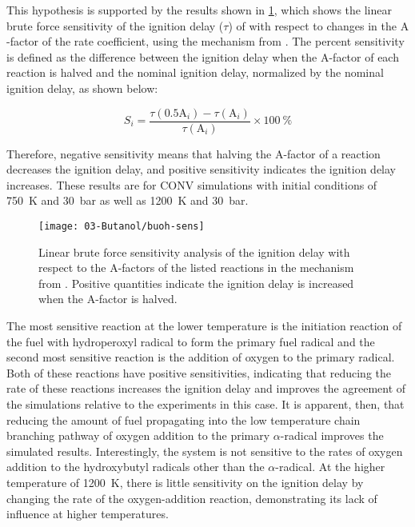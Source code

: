 \documentclass[../main.tex]{subfiles}
\begin{document}
This hypothesis is supported by the results shown in \cref{fig:buoh-sens},
which shows the linear brute force sensitivity of the ignition delay ($\tau$)
of \iBuOH{} with respect to changes in the $\mathrm{A}$-factor of the rate coefficient, using
the mechanism from \textcite{Sarathy2012}. The percent sensitivity is defined
as the difference between the ignition delay when the $\mathrm{A}$-factor of each reaction
is halved and the nominal ignition delay, normalized by the nominal ignition
delay, as shown below:

\begin{equation}
    \label{eq:buoh-sens}
    S_i=\frac{\tau(0.5\mathrm{A}_i )-\tau(\mathrm{A}_i )}{\tau(\mathrm{A}_i)} \times \SI{100}{\percent}
\end{equation}

Therefore, negative sensitivity means that halving the $\mathrm{A}$-factor of a reaction
decreases the ignition delay, and positive sensitivity indicates the ignition
delay increases. These results are for CONV simulations with initial conditions
of \SI{750}{\kelvin} and \SI{30}{\bar} as well as \SI{1200}{\kelvin} and \SI{30}{\bar}.

\begin{figure}
    \texttt{[image: 03-Butanol/buoh-sens]}
    \caption{Linear brute force sensitivity analysis of the ignition delay with
        respect to the A-factors of the listed reactions in the mechanism from
        \textcite{Sarathy2012}. Positive quantities indicate the ignition delay
        is increased when the $\mathrm{A}$-factor is halved.}
    \label{fig:buoh-sens}
\end{figure}

The most sensitive reaction at the lower temperature is the initiation reaction
of the fuel with hydroperoxyl radical to form the primary fuel radical and the
second most sensitive reaction is the addition of oxygen to the primary
radical. Both of these reactions have positive sensitivities, indicating that
reducing the rate of these reactions increases the ignition delay
and improves the agreement of the simulations relative to the experiments
in this case. It is apparent, then, that reducing the amount of fuel
propagating into the low temperature chain branching pathway of oxygen
addition to the primary $\alpha$-radical improves the simulated results.
Interestingly, the \iBuOH{} system is not sensitive to the rates of
oxygen addition to the hydroxybutyl radicals other than the
$\alpha$-radical. At the higher temperature of \SI{1200}{\kelvin}, there
is little sensitivity on the ignition delay by changing the rate of the
oxygen-addition reaction, demonstrating its lack of influence at higher
temperatures.
\end{document}
